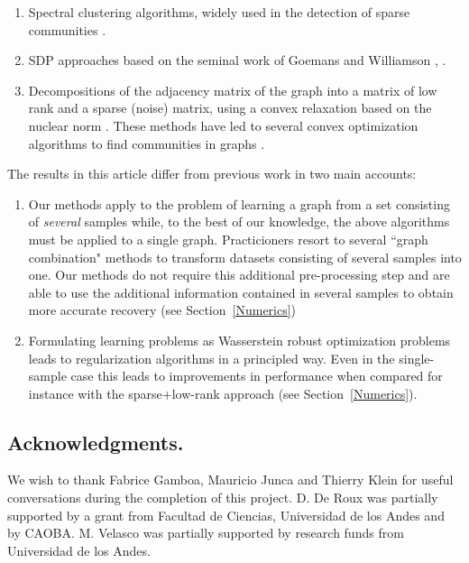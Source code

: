 \documentclass[12pt]{amsart}
\theoremstyle{remark}
\begin{document}
\begin{enumerate}
\item Spectral clustering algorithms, widely used in the detection of sparse communities \cite{bordenave2015non, chin2015stochastic,krzakala2013spectral, massoulie2014community}. 

\item SDP approaches based on the seminal work of Goemans and Williamson \cite{goemans1995improved}, \cite{abbe2016exact,guedon2016community, montanari2016semidefinite}.

\item Decompositions of the adjacency matrix of the graph into a matrix of low rank and a sparse (noise) matrix, using a convex relaxation based on the nuclear norm \cite{candes2011robust,chandrasekaran2011rank,candes2009exact}. These methods have led to several convex optimization algorithms to find communities in graphs \cite{ames2011nuclear,vinayak2014sharp,chen2012clustering,chen2014clustering,oymak2011finding,ailon2013breaking}.

\end{enumerate}

The results in this article differ from previous work in two main accounts:

\begin{enumerate}
\item Our methods apply to the problem of learning a graph from a set consisting of {\it several} samples while, to the best of our knowledge, the above algorithms must be applied to a single graph. Practicioners resort to several ``graph combination" methods to transform datasets consisting of several samples into one. Our methods do not require this additional pre-processing step and are able to use the additional information contained in several samples to obtain more accurate recovery (see Section~\ref{Numerics})

\item Formulating learning problems as Wasserstein robust optimization problems leads to regularization algorithms in a principled way. Even in the single-sample case this leads to improvements in performance when compared for instance with the sparse+low-rank approach (see Section~\ref{Numerics}).
\end{enumerate}


\subsection{Acknowledgments.}
We wish to thank Fabrice Gamboa, Mauricio Junca and Thierry Klein for useful conversations during the completion of this project. D. De Roux was partially supported by a grant from Facultad de Ciencias, Universidad de los Andes and by CAOBA. M. Velasco was partially supported by research funds from Universidad de los Andes. 
\end{document}
